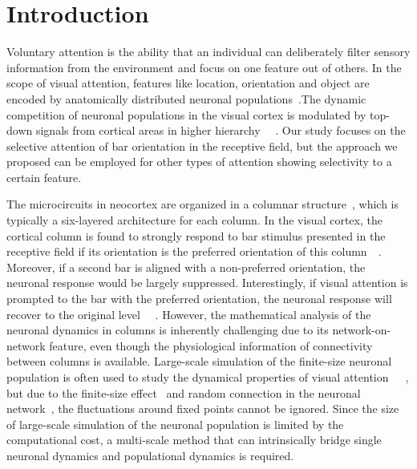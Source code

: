 \documentclass[10pt,letterpaper]{article}
\begin{document}
\linenumbers

\section*{Introduction}

Voluntary attention is the ability that an individual can deliberately filter sensory information from the environment and focus on one feature out of others. In the scope of visual attention, features like location, orientation and object are encoded by anatomically distributed neuronal populations~\cite{serences2006}.The dynamic competition of neuronal populations in the visual cortex is modulated by top-down signals from cortical areas in higher hierarchy ~\cite{katsuki2014}~\cite{paneri2017}. Our study focuses on the selective attention of bar orientation in the receptive field, but the approach we proposed can be employed for other types of attention showing selectivity to a certain feature.

The microcircuits in neocortex are organized in a columnar structure~\cite{Mountcastle1957}, which is typically a six-layered architecture for each column. In the visual cortex, the cortical column is found to strongly respond to bar stimulus presented in the receptive field if its orientation is the preferred orientation of this column~\cite{hubel1959}~\cite{reynolds1999}. Moreover, if a second bar is aligned with a non-preferred orientation, the neuronal response would be largely suppressed. Interestingly, if visual attention is prompted to the bar with the preferred orientation, the neuronal response will recover to the original level ~\cite{reynolds1999}~\cite{luck1997}. However, the mathematical analysis of the neuronal dynamics in columns is inherently challenging due to its network-on-network feature, even though the physiological information of connectivity between columns is available. Large-scale simulation of the finite-size neuronal population is often used to study the dynamical properties of visual attention~\cite{corchs2002}~\cite{wagatsuma2011}~\cite{potjans2012}, but due to the finite-size effect~\cite{pikovsky1999} and random connection in the neuronal network~\cite{landau2018}, the fluctuations around fixed points cannot be ignored. Since the size of large-scale simulation of the neuronal population is limited by the computational cost, a multi-scale method that can intrinsically bridge single neuronal dynamics and populational dynamics is required.
\end{document}
